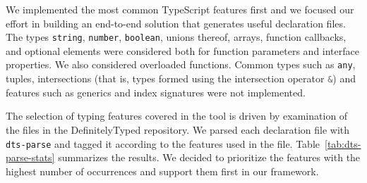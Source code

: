 \documentclass[sigconf]{acmart}
\begin{document}
We implemented the most common TypeScript features first and we focused our effort in building an
end-to-end solution that generates useful declaration files. The
types \texttt{string}, \texttt{number}, \texttt{boolean}, unions
thereof, arrays, function callbacks, and optional elements were considered
both for function parameters and interface properties. We also
considered overloaded functions.
Common types such as
\texttt{any}, tuples, intersections (that
is, types formed using the intersection operator \lstinline[language=TypeScript]/&/) and features such as
generics and index signatures were not implemented.

The selection of typing features covered in the tool is driven by
examination of the files in
the DefinitelyTyped repository. We parsed each declaration file with
\texttt{dts-parse} and tagged it according to the features used in the file.
Table~\ref{tab:dts-parse-stats} summarizes the results.
We decided to prioritize the features with the highest number of
occurrences and support them first in our framework.
\end{document}
